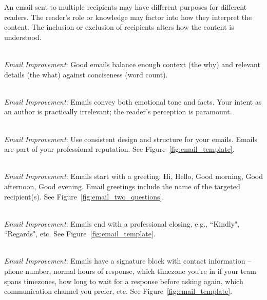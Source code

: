 An email sent to multiple recipients may have different purposes for different readers. The reader's role or knowledge may factor into how they interpret the content. The inclusion or exclusion of recipients alters how the content is understood. 

\ \\
\textit{Email Improvement}: Good emails balance enough context (the why) and relevant details (the what) against conciseness (word count). 

\ \\
\textit{Email Improvement}: Emails convey both emotional tone and facts. Your intent as an author is practically irrelevant; the reader's perception is paramount. 



\ \\
\textit{Email Improvement}: Use consistent design and structure for your emails. Emails are part of your professional reputation. See Figure~\ref{fig:email_template}.

\ \\
\textit{Email Improvement}: Emails start with a greeting: Hi, Hello, Good morning, Good afternoon, Good evening. 
Email greetings include the name of the targeted recipient(s). See Figure~\ref{fig:email_two_questions}.

\ \\
\textit{Email Improvement}: Emails end with a professional closing, e.g., ``Kindly", ``Regards", etc. See Figure~\ref{fig:email_template}. %

\ \\
\textit{Email Improvement}: Emails have a signature block with contact information -- phone number, normal hours of response, which timezone you're in if your team spans timezones, how long to wait for a response before asking again, which communication channel you prefer, etc. See Figure~\ref{fig:email_template}. %

